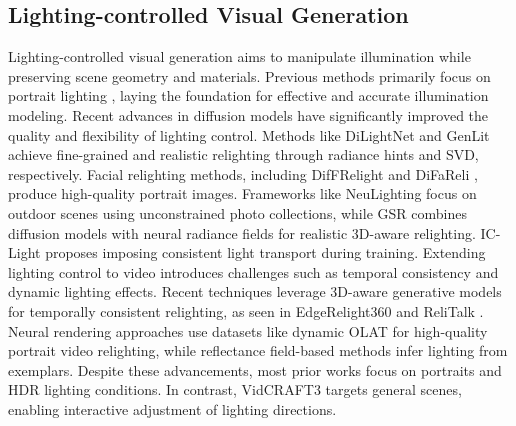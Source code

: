 \subsection{Lighting-controlled Visual Generation}
Lighting-controlled visual generation aims to manipulate illumination while preserving scene geometry and materials. 
Previous methods primarily focus on portrait lighting \cite{sun2019single,zhou2019deep,rao2024lite2relight,pandey2021total,nestmeyer2020learning,kim2024switchlight,sengupta2018sfsnet,shu2017portrait,he2024diffrelight,ponglertnapakorn2023difareli,zhang2024lumisculpt}, laying the foundation for effective and accurate illumination modeling.
Recent advances in diffusion models have significantly improved the quality and flexibility of lighting control. Methods like DiLightNet \cite{zeng2024dilightnet} and GenLit \cite{bharadwaj2024genlit} achieve fine-grained and realistic relighting through radiance hints and SVD, respectively. Facial relighting methods, including DifFRelight \cite{he2024diffrelight} and DiFaReli \cite{ponglertnapakorn2023difareli}, produce high-quality portrait images. Frameworks like NeuLighting \cite{li2022neulighting} focus on outdoor scenes using unconstrained photo collections, while GSR \cite{poirier2024diffusion} combines diffusion models with neural radiance fields for realistic 3D-aware relighting. IC-Light \cite{zhangscaling} proposes imposing consistent light transport during training.
Extending lighting control to video \cite{zhang2024lumisculpt} introduces challenges such as temporal consistency and dynamic lighting effects. Recent techniques leverage 3D-aware generative models for temporally consistent relighting, as seen in EdgeRelight360 \cite{lin2024edgerelight360} and ReliTalk \cite{qiu2024relitalk}. Neural rendering approaches \cite{cai2024real,zhang2021neural} use datasets like dynamic OLAT for high-quality portrait video relighting, while reflectance field-based methods \cite{huynh2021new} infer lighting from exemplars.
Despite these advancements, most prior works focus on portraits and HDR lighting conditions. In contrast, VidCRAFT3 targets general scenes, enabling interactive adjustment of lighting directions.